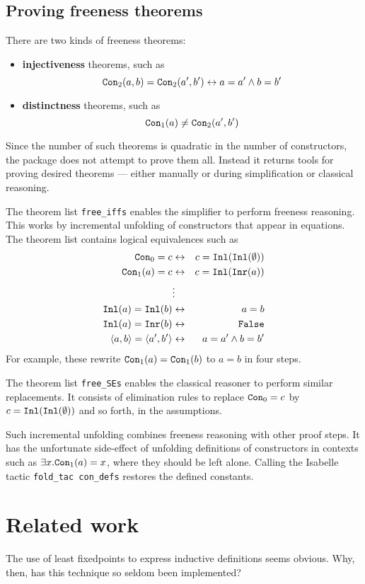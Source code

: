 \documentclass[12pt]{article}
\newcommand\defn[1]{{\bf#1}}
\newcommand\Inl{\hbox{\tt Inl}}
\newcommand\Inr{\hbox{\tt Inr}}
\newcommand\Con{\hbox{\tt Con}}
\begin{document}
\subsection{Proving freeness theorems}
There are two kinds of freeness theorems:
\begin{itemize}
\item \defn{injectiveness} theorems, such as
\[ \Con_2(a,b) = \Con_2(a',b') \bimp a=a' \conj b=b' \]

\item \defn{distinctness} theorems, such as
\[ \Con_1(a) \not= \Con_2(a',b')  \]
\end{itemize}
Since the number of such theorems is quadratic in the number of constructors,
the package does not attempt to prove them all.  Instead it returns tools for
proving desired theorems --- either manually or during
simplification or classical reasoning.

The theorem list \verb|free_iffs| enables the simplifier to perform freeness
reasoning.  This works by incremental unfolding of constructors that appear in
equations.  The theorem list contains logical equivalences such as
\begin{eqnarray*}
  \Con_0=c      & \bimp &  c=\Inl(\Inl(\emptyset))     \\
  \Con_1(a)=c   & \bimp &  c=\Inl(\Inr(a))             \\
                & \vdots &                             \\
  \Inl(a)=\Inl(b)   & \bimp &  a=b                     \\
  \Inl(a)=\Inr(b)   & \bimp &  {\tt False}             \\
  \pair{a,b} = \pair{a',b'} & \bimp & a=a' \conj b=b'
\end{eqnarray*}
For example, these rewrite $\Con_1(a)=\Con_1(b)$ to $a=b$ in four steps.

The theorem list \verb|free_SEs| enables the classical
reasoner to perform similar replacements.  It consists of elimination rules
to replace $\Con_0=c$ by $c=\Inl(\Inl(\emptyset))$ and so forth, in the
assumptions.

Such incremental unfolding combines freeness reasoning with other proof
steps.  It has the unfortunate side-effect of unfolding definitions of
constructors in contexts such as $\exists x.\Con_1(a)=x$, where they should
be left alone.  Calling the Isabelle tactic {\tt fold\_tac con\_defs}
restores the defined constants.


\section{Related work}\label{related}
The use of least fixedpoints to express inductive definitions seems
obvious.  Why, then, has this technique so seldom been implemented?
\end{document}
